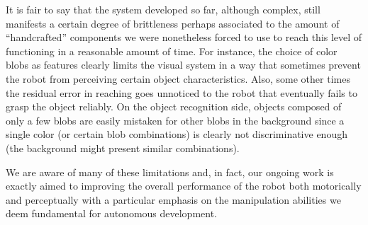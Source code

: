 It is fair to say that the system developed so far, although complex, still manifests a certain degree of brittleness perhaps associated to the amount of ``handcrafted'' components we were nonetheless forced to use to reach this level of functioning in a reasonable amount of time. For instance, the choice of color blobs as features clearly limits the visual system in a way that sometimes prevent the robot from perceiving certain object characteristics. Also, some other times the residual error in reaching goes unnoticed to the robot that eventually fails to grasp the object reliably. On the object recognition side, objects composed of only a few blobs are easily mistaken for other blobs in the background since a single color (or certain blob combinations) is clearly not discriminative enough (the background might present similar combinations). 

We are aware of many of these limitations and, in fact, our ongoing work is exactly aimed to improving the overall performance of the robot both motorically and perceptually with a particular emphasis on the manipulation abilities we deem fundamental for autonomous development.




